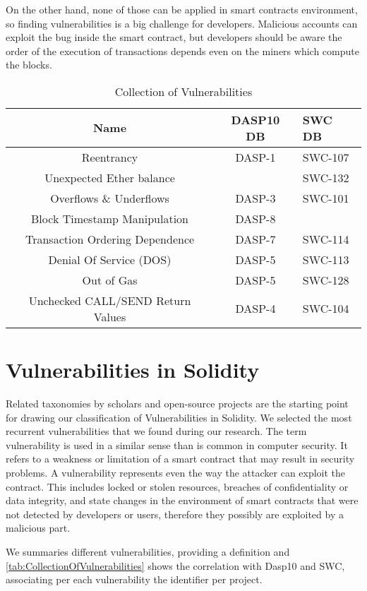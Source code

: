 \documentclass[a4paper,sigconf, language=french,
language=german, language=spanish, language=english]{acmart}
\begin{document}
On the other hand, none of those can be applied in smart contracts environment, so finding vulnerabilities is a big challenge for developers. 
Malicious accounts can exploit the bug inside the smart contract, but developers should be aware the order of the execution of transactions depends even on the miners which compute the blocks.

\begin{table*}
  \caption{Collection of Vulnerabilities}
  \label{tab:CollectionOfVulnerabilities}
  \begin{tabular}{ccl}
    \toprule
    Name  & DASP10 DB & SWC DB \\
    \midrule
    Reentrancy  & DASP-1 & SWC-107\\
    Unexpected Ether balance  & & SWC-132  \\
    Overflows \& Underflows  & DASP-3 & SWC-101\\
    Block Timestamp Manipulation  & DASP-8 & \\
    Transaction Ordering Dependence  & DASP-7  & SWC-114 \\
    Denial Of Service (DOS)  & DASP-5 &  SWC-113\\
    Out of Gas  & DASP-5 & SWC-128 \\
     Unchecked CALL/SEND Return Values  & DASP-4 & SWC-104\\
  \bottomrule
\end{tabular}
\end{table*}

\section{Vulnerabilities in Solidity}
\label{Vulnerabilities}
Related taxonomies by scholars and open-source projects are the starting point for drawing our classification of Vulnerabilities in Solidity. 
We selected the most recurrent vulnerabilities that we found during our research.
The term vulnerability is used in a similar sense than is common in computer security. 
It refers to a weakness or limitation of a smart contract that may result in
security problems. 
A vulnerability represents even the way the attacker can exploit the contract. 
This includes locked or stolen resources, breaches of confidentiality or data integrity, and state
changes in the environment of smart contracts that were not
detected by developers or users, therefore they possibly are exploited by a malicious part.

We summaries different vulnerabilities, providing a definition and \autoref{tab:CollectionOfVulnerabilities} shows the correlation with Dasp10 and SWC, associating per each vulnerability the identifier per project.
\end{document}
